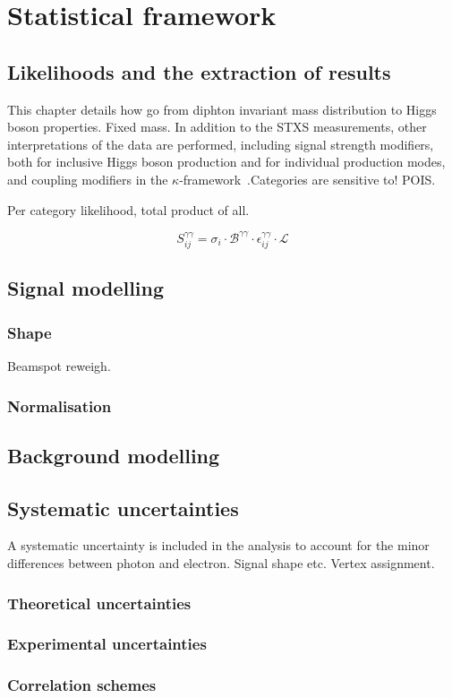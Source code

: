 \chapter{Statistical framework}
\label{chap:hgg_stats}

\section{Likelihoods and the extraction of results}
This chapter details how go from diphton invariant mass distribution to Higgs boson properties. Fixed mass.
In addition to the STXS measurements, other interpretations of the data are performed, including signal strength modifiers, both for inclusive Higgs boson production and for individual production modes, and coupling modifiers in the $\kappa$-framework~\cite{}.Categories are sensitive to! POIS.

Per category likelihood, total product of all.

\begin{equation}
    S^{\gamma\gamma}_{ij} = \sigma_i \cdot \mathcal{B}^{\gamma\gamma} \cdot \epsilon^{\gamma\gamma}_{ij} \cdot \mathcal{L}
\end{equation}

\section{Signal modelling}
\subsection{Shape}
Beamspot reweigh. 

\subsection{Normalisation}


\section{Background modelling}

\section{Systematic uncertainties}
A systematic uncertainty is included in the analysis to account for the minor differences between photon and electron. Signal shape etc. Vertex assignment.
\subsection{Theoretical uncertainties}

\subsection{Experimental uncertainties}

\subsection{Correlation schemes}